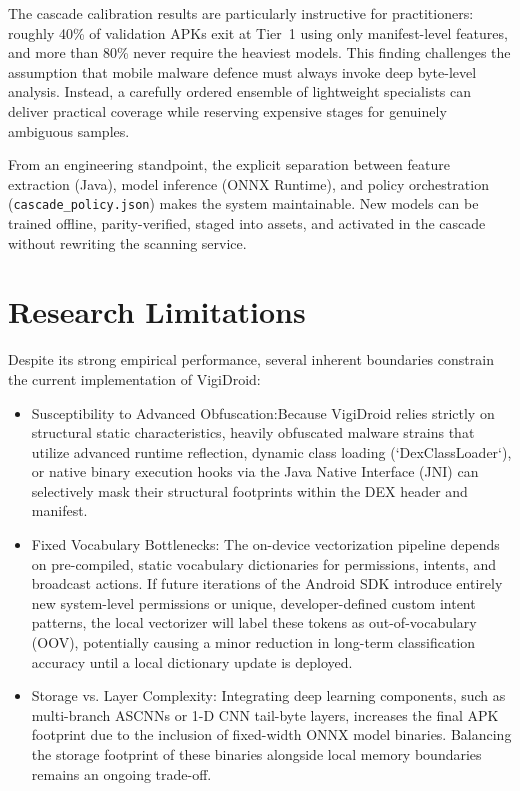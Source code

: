 The cascade calibration results are particularly instructive for practitioners: roughly 40\% of validation APKs exit at Tier~1 using only manifest-level features, and more than 80\% never require the heaviest models. This finding challenges the assumption that mobile malware defence must always invoke deep byte-level analysis. Instead, a carefully ordered ensemble of lightweight specialists can deliver practical coverage while reserving expensive stages for genuinely ambiguous samples.

From an engineering standpoint, the explicit separation between feature extraction (Java), model inference (ONNX Runtime), and policy orchestration (\texttt{cascade\_policy.json}) makes the system maintainable. New models can be trained offline, parity-verified, staged into assets, and activated in the cascade without rewriting the scanning service.

\section{Research Limitations}

Despite its strong empirical performance, several inherent boundaries constrain the current implementation of VigiDroid:
\begin{itemize}
    \item Susceptibility to Advanced Obfuscation:Because VigiDroid relies strictly on structural static characteristics, heavily obfuscated malware strains that utilize advanced runtime reflection, dynamic class loading (`DexClassLoader`), or native binary execution hooks via the Java Native Interface (JNI) can selectively mask their structural footprints within the DEX header and manifest.
\item Fixed Vocabulary Bottlenecks: The on-device vectorization pipeline depends on pre-compiled, static vocabulary dictionaries for permissions, intents, and broadcast actions. If future iterations of the Android SDK introduce entirely new system-level permissions or unique, developer-defined custom intent patterns, the local vectorizer will label these tokens as out-of-vocabulary (OOV), potentially causing a minor reduction in long-term classification accuracy until a local dictionary update is deployed.
\item Storage vs. Layer Complexity: Integrating deep learning components, such as multi-branch ASCNNs or 1-D CNN tail-byte layers, increases the final APK footprint due to the inclusion of fixed-width ONNX model binaries. Balancing the storage footprint of these binaries alongside local memory boundaries remains an ongoing trade-off.
\end{itemize}
